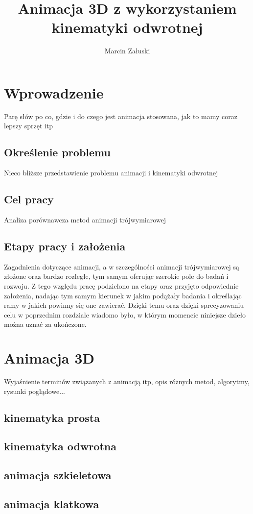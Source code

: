 \documentclass[11pt]{mwrep}
\author{Marcin Załuski}
\title{Animacja 3D z wykorzystaniem kinematyki odwrotnej}
\begin{document}
\maketitle
\tableofcontents
\chapter{Wprowadzenie}
Parę słów po co, gdzie i do czego jest animacja stosowana, jak to mamy coraz lepszy sprzęt itp
  \section{Określenie problemu}
Nieco bliższe przedstawienie problemu animacji i kinematyki odwrotnej
  \section{Cel pracy}
Analiza porównawcza metod animacji trójwymiarowej
  \section{Etapy pracy i założenia}

Zagadnienia dotyczące animacji, a w szczególności animacji trójwymiarowej są złożone oraz bardzo rozległe, tym samym oferując szerokie pole do badań i rozwoju. Z tego względu pracę podzielono na etapy oraz przyjęto odpowiednie założenia, nadając tym samym kierunek w jakim podążały badania i określając ramy w jakich powinny się one zawierać. Dzięki temu oraz dzięki sprecyzowaniu celu w poprzednim rozdziale wiadomo było, w którym momencie niniejsze dzieło można uznać za ukończone.


\chapter{Animacja 3D}
Wyjaśnienie terminów związanych z animacją itp, opis różnych metod, algorytmy, rysunki poglądowe...
  \section{kinematyka prosta}
  \section{kinematyka odwrotna}
  \section{animacja szkieletowa}
  \section{animacja klatkowa}
\end{document}

